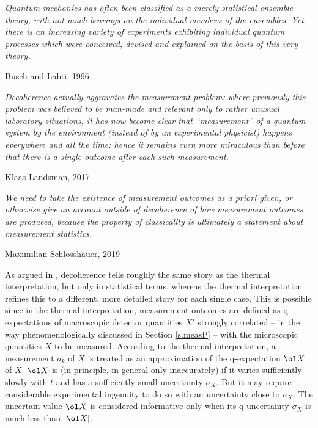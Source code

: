 \documentclass[12pt]{article}
\begin{document}
\bigskip


\nopagebreak
\hfill\parbox[t]{10.8cm}{\footnotesize

{\em Quantum mechanics has often been classified as a merely
statistical ensemble theory, with not much bearings on the individual
members of the ensembles. Yet there is an increasing variety of
experiments exhibiting individual quantum processes which were
conceived, devised and explained on the basis of this very theory.
}

\hfill Busch and Lahti, 1996 \cite[p.5899]{BusL}
}

\bigskip


\nopagebreak
\hfill\parbox[t]{10.8cm}{\footnotesize

{\em Decoherence actually aggravates the measurement problem: where 
previously this problem was believed to be man-made and relevant only 
to rather unusual laboratory situations, it has now become clear that 
``measurement'' of a quantum system by the environment (instead of by 
an experimental physicist) happens everywhere and all the time: hence 
it remains even more miraculous than before that there is a single 
outcome after each such measurement.}

\hfill Klaas Landsman, 2017 \cite[p.443]{Lan2017} 
}

\bigskip


\nopagebreak
\hfill\parbox[t]{10.8cm}{\footnotesize

{\em We need to take the existence of measurement outcomes as a priori
given, or otherwise give an account outside of decoherence of how
measurement outcomes are produced, because the property of classicality
is ultimately a statement about measurement statistics.}


\hfill Maximilian Schlosshauer, 2019 \cite[p.72]{Schl2019}
}

\bigskip

As argued in  \cite[Section 10,5]{Neu.CQP}, decoherence
tells roughly the same story as the thermal interpretation, but only in
statistical terms, whereas the thermal interpretation refines this to a
different, more detailed story for each single case. This is possible
since in the thermal interpretation, measurement outcomes are defined 
as q-expectations of macroscopic detector quantities $X'$ strongly 
correlated -- in the way phenomenologically discussed in Section 
\ref{s.measP} -- with the microscopic quantities $X$ to be measured.
According to the thermal interpretation, a measurement $a_k$ of $X$ is
treated as an approximation of the q-expectation $\ol X$ of $X$. 
$\ol X$ is (in principle, in general only inaccurately)
 if it varies sufficiently slowly with $t$ and has a 
sufficiently small uncertainty $\sigma_X$. But it may require 
considerable experimental ingenuity to do so with an uncertainty close 
to $\sigma_X$. The uncertain value $\ol X$ is considered informative 
only when its q-uncertainty $\sigma_X$ is much less than $|\ol X|$.
\end{document}
